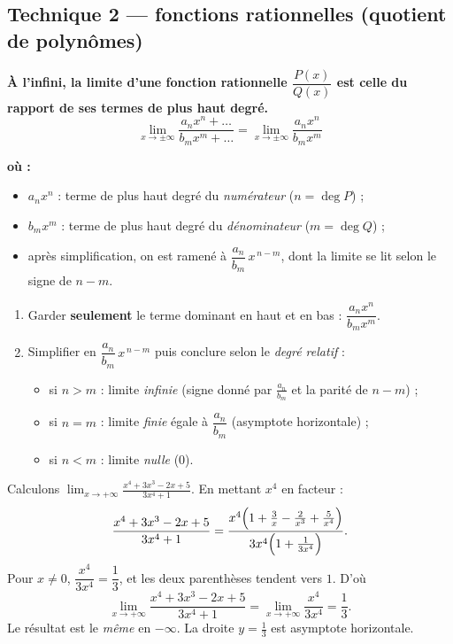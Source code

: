 \documentclass[11pt,a4paper]{article}
\newenvironment{ou}{%
  \par\smallskip\noindent\textbf{où :}\nopagebreak
  \begin{itemize}[leftmargin=1.8em,topsep=2pt,itemsep=1.5pt,parsep=0pt]}%
  {\end{itemize}}
\begin{document}
\subsection{Technique 2 — fonctions rationnelles (quotient de polynômes)}

\begin{theoreme}
\textbf{À l'infini, la limite d'une fonction rationnelle $\dfrac{P(x)}{Q(x)}$ est celle du rapport
de ses termes de plus haut degré.}
\[ \boxed{\ \lim_{x\to\pm\infty}\frac{a_n x^n+\dots}{b_m x^m+\dots}=\lim_{x\to\pm\infty}\frac{a_n x^n}{b_m x^m}\ } \]
\end{theoreme}

\begin{ou}
  \item $a_n x^n$ : terme de plus haut degré du \emph{numérateur} ($n=\deg P$) ;
  \item $b_m x^m$ : terme de plus haut degré du \emph{dénominateur} ($m=\deg Q$) ;
  \item après simplification, on est ramené à $\dfrac{a_n}{b_m}\,x^{\,n-m}$, dont la limite se lit selon le signe de $n-m$.
\end{ou}

\begin{methode}
\begin{enumerate}[leftmargin=1.9em,topsep=2pt,itemsep=2pt]
  \item Garder \textbf{seulement} le terme dominant en haut et en bas : $\dfrac{a_n x^n}{b_m x^m}$.
  \item Simplifier en $\dfrac{a_n}{b_m}\,x^{\,n-m}$ puis conclure selon le \emph{degré relatif} :
  \begin{itemize}[leftmargin=1.4em,topsep=1pt]
     \item si $n>m$ : limite \emph{infinie} (signe donné par $\tfrac{a_n}{b_m}$ et la parité de $n-m$) ;
     \item si $n=m$ : limite \emph{finie} égale à $\dfrac{a_n}{b_m}$ (asymptote horizontale) ;
     \item si $n<m$ : limite \emph{nulle} ($0$).
  \end{itemize}
\end{enumerate}
\end{methode}

\begin{exemple}[type 1 : $n=m$ (degrés égaux) $\to$ limite finie]
Calculons $\displaystyle\lim_{x\to+\infty}\frac{x^4+3x^3-2x+5}{3x^4+1}$. En mettant $x^4$ en facteur :
\[ \frac{x^4+3x^3-2x+5}{3x^4+1}
   =\frac{x^4\Bigl(1+\frac3x-\frac{2}{x^3}+\frac{5}{x^4}\Bigr)}{3x^4\Bigl(1+\frac{1}{3x^4}\Bigr)}. \]
Pour $x\neq 0$, $\dfrac{x^4}{3x^4}=\dfrac13$, et les deux parenthèses tendent vers $1$. D'où
\[ \lim_{x\to+\infty}\frac{x^4+3x^3-2x+5}{3x^4+1}=\lim_{x\to+\infty}\frac{x^4}{3x^4}=\frac13. \]
Le résultat est le \emph{même} en $-\infty$. La droite $y=\tfrac13$ est asymptote horizontale.
\end{exemple}
\end{document}
